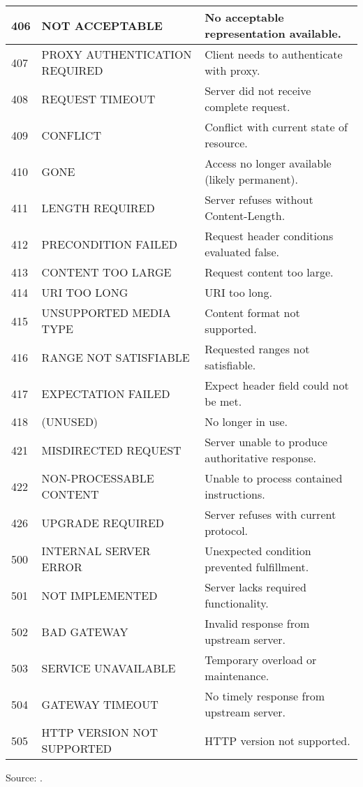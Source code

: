 \begin{longtable}{@{}>{}l >{\raggedright\arraybackslash}p{5cm} >{\raggedright\arraybackslash}p{8cm}@{}}
406 & NOT ACCEPTABLE & No acceptable representation available. \\ \hline
407 & PROXY AUTHENTICATION REQUIRED & Client needs to authenticate with proxy. \\ \hline
408 & REQUEST TIMEOUT & Server did not receive complete request. \\ \hline
409 & CONFLICT & Conflict with current state of resource. \\ \hline
410 & GONE & Access no longer available (likely permanent). \\ \hline
411 & LENGTH REQUIRED & Server refuses without Content-Length. \\ \hline
412 & PRECONDITION FAILED & Request header conditions evaluated false. \\ \hline
413 & CONTENT TOO LARGE & Request content too large. \\ \hline
414 & URI TOO LONG & URI too long. \\ \hline
415 & UNSUPPORTED MEDIA TYPE & Content format not supported. \\ \hline
416 & RANGE NOT SATISFIABLE & Requested ranges not satisfiable. \\ \hline
417 & EXPECTATION FAILED & Expect header field could not be met. \\ \hline
418 & (UNUSED) & No longer in use. \\ \hline
421 & MISDIRECTED REQUEST & Server unable to produce authoritative response. \\ \hline
422 & NON-PROCESSABLE CONTENT & Unable to process contained instructions. \\ \hline
426 & UPGRADE REQUIRED & Server refuses with current protocol. \\ \hline
500 & INTERNAL SERVER ERROR & Unexpected condition prevented fulfillment. \\ \hline
501 & NOT IMPLEMENTED & Server lacks required functionality. \\ \hline
502 & BAD GATEWAY & Invalid response from upstream server. \\ \hline
503 & SERVICE UNAVAILABLE & Temporary overload or maintenance. \\ \hline
504 & GATEWAY TIMEOUT & No timely response from upstream server. \\ \hline
505 & HTTP VERSION NOT SUPPORTED & HTTP version not supported. \\

\end{longtable}
\label{tab:summary_http_status_codes}
\centering
\footnotesize Source: \cite{rfc9110}.